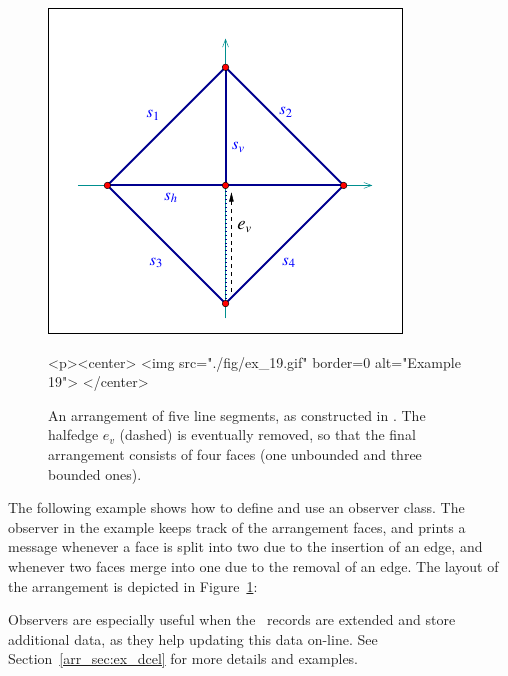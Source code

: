 \begin{figure}[!htp]
\begin{ccTexOnly}
  \begin{center}
  \includegraphics{Arrangement_2/fig/ex_19}
  \end{center}
\end{ccTexOnly}
\begin{ccHtmlOnly}
  <p><center>
  <img src="./fig/ex_19.gif" border=0 alt="Example 19">
  </center>
\end{ccHtmlOnly}
\caption{An arrangement of five line segments, as constructed in
. The halfedge $e_v$ (dashed) is eventually
removed, so that the final arrangement consists of four faces (one
unbounded and three bounded ones).}
\label{arr_fig:ex_19}
\end{figure}

The following example shows how to define and use an observer
class. The observer in the example keeps track of the arrangement
faces, and prints a message whenever a face is split into two due
to the insertion of an edge, and whenever two faces merge into one
due to the removal of an edge. The layout of the arrangement is
depicted in Figure~\ref{arr_fig:ex_19}:


Observers are especially useful when the \dcel\ records are
extended and store additional data, as they help updating this
data on-line. See Section~\ref{arr_sec:ex_dcel} for more details
and examples.

